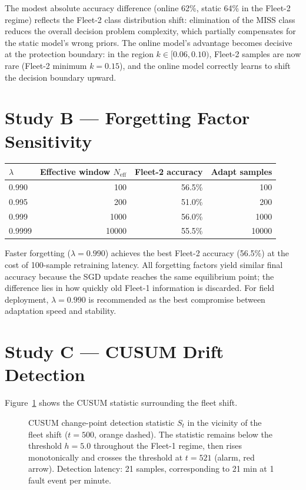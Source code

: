 \documentclass[11pt,a4paper]{article}
\begin{document}
\noindent
The modest absolute accuracy difference (online 62\%, static 64\% in
the Fleet-2 regime) reflects the Fleet-2 class distribution shift: elimination
of the MISS class reduces the overall decision problem complexity, which
partially compensates for the static model's wrong priors.  The online model's
advantage becomes decisive at the protection boundary: in the region
$k\in[0.06,0.10)$, Fleet-2 samples are now rare (Fleet-2 minimum $k=0.15$),
and the online model correctly learns to shift the decision boundary upward.

\section{Study B --- Forgetting Factor Sensitivity}
\label{sec:studyB}

\begin{center}
\begin{tabular}{@{}lrrr@{}}
\toprule
$\lambda$ & Effective window $N_\mathrm{eff}$ & Fleet-2 accuracy & Adapt samples \\
\midrule
0.990  & 100  & 56.5\% & 100 \\
0.995  & 200  & 51.0\% & 200 \\
0.999  & 1000 & 56.0\% & 1000 \\
0.9999 & 10000 & 55.5\% & 10000 \\
\bottomrule
\end{tabular}
\end{center}

\medskip\noindent
Faster forgetting ($\lambda=0.990$) achieves the best Fleet-2 accuracy (56.5\%)
at the cost of 100-sample retraining latency.  All forgetting factors yield
similar final accuracy because the SGD update reaches the same equilibrium
point; the difference lies in how quickly old Fleet-1 information is
discarded.  For field deployment, $\lambda=0.990$ is recommended as the
best compromise between adaptation speed and stability.

\section{Study C --- CUSUM Drift Detection}
\label{sec:studyC}

Figure~\ref{fig:cusum} shows the CUSUM statistic surrounding the fleet shift.

\begin{figure}[htbp]
  \centering
  \resizebox{0.96\textwidth}{!}{}
  \caption{CUSUM change-point detection statistic $S_t$ in the vicinity of
           the fleet shift ($t=500$, orange dashed).  The statistic remains
           below the threshold $h=5.0$ throughout the Fleet-1 regime, then
           rises monotonically and crosses the threshold at $t=521$ (alarm,
           red arrow).  Detection latency: 21 samples, corresponding to 21
           min at 1 fault event per minute.}
  \label{fig:cusum}
\end{figure}
\end{document}
